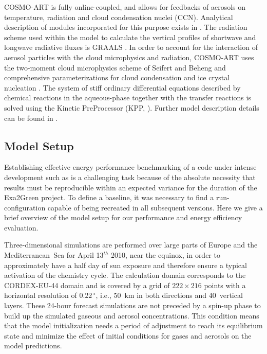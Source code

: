 COSMO-ART  is  fully  online-coupled,  and  allows  for  feedbacks  of
aerosols  on  temperature,  radiation  and cloud  condensation  nuclei
(CCN).   Analytical  description  of  modules  incorporated  for  this
purpose  exists  in  \cite{Vogel-2009, Bangert-2011}.   The  radiation
scheme used  within the  model to calculate  the vertical  profiles of
shortwave and longwave  radiative fluxes is GRAALS \cite{Ritter-1992}.
In order to account for  the interaction of aerosol particles with the
cloud microphysics and radiation,  COSMO-ART uses the two-moment cloud
microphysics  scheme  of Seifert  and  Beheng \cite{Seifert-2006}  and
comprehensive parameterizations for cloud condensation and ice crystal
nucleation  \cite{Bangert-2011, Bangert-2012}.   The  system of  stiff
ordinary differential equations described by chemical reactions in the
aqueous-phase together with the transfer reactions is solved using the
Kinetic   PreProcessor   (KPP,   \cite{Damian-2002}).  Further   model
description  details can be  found in  \cite{Bangert-2012, Knote-2011,
  Knote-2013}.

\subsection{Model Setup}
\label{subsec:1.2}

Establishing effective energy performance benchmarking of a code under
intense development such as \cosmoart is a challenging task because of
the  absolute necessity that  results must  be reproducible  within an
expected variance  for the duration of the  Exa2Green pro\-je\-ct.  To
define  a  baseline, it  was  necessary  to  find a  run-configuration
capable of being recreated in all subsequent versions.  Here we give a
brief  overview of  the model  setup  for our  performance and  energy
efficiency evaluation.

Three-dimensional simulations are performed over large parts of Europe
and the Mediterranean~Sea for  April 13$^{th}$ 2010, near the equinox,
in  order  to  approximately have  a  half  day  of sun  exposure  and
therefore  ensure a typical  activation of  the chemistry  cycle.  The
calculation  domain  corresponds to  the  CORDEX-EU-44  domain and  is
covered  by  a  grid  of  $222\times 216$  points  with  a  horizontal
resolution  of $0.22\,^{\circ}$,  i.e., 50~km  in both  directions and
40~vertical  layers.   These  24-hour  forecast  simulations  are  not
preceded  by a spin-up  phase to  build up  the simulated  gaseous and
aerosol   concentrations.   This  condition   means  that   the  model
initialization needs  a period of adjustment to  reach its equilibrium
state  and minimize  the effect  of initial  conditions for  gases and
aerosols on the model predictions.

